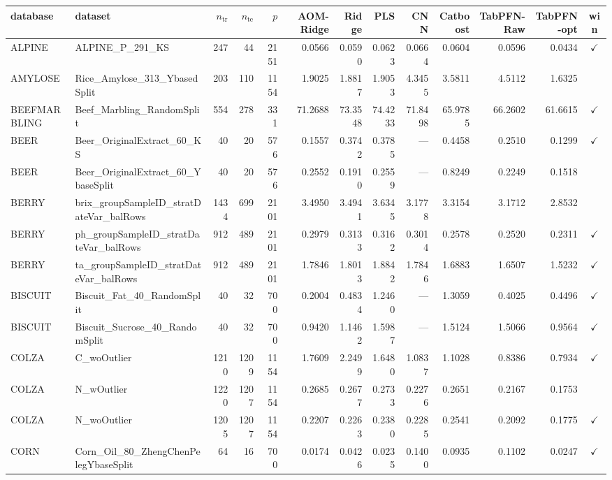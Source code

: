 \begin{tabular}{llrrrrrrrrrrc}
\toprule
database & dataset & $n_\text{tr}$ & $n_\text{te}$ & $p$ & AOM-Ridge & Ridge & PLS & CNN & Catboost & TabPFN-Raw & TabPFN-opt & win \\
\midrule
ALPINE & ALPINE\_P\_291\_KS & 247 & 44 & 2151 & 0.0566 & 0.0590 & 0.0623 & 0.0664 & 0.0604 & 0.0596 & 0.0434 & $\checkmark$ \\
AMYLOSE & Rice\_Amylose\_313\_YbasedSplit & 203 & 110 & 1154 & 1.9025 & 1.8817 & 1.9053 & 4.3455 & 3.5811 & 4.5112 & 1.6325 &  \\
BEEFMARBLING & Beef\_Marbling\_RandomSplit & 554 & 278 & 331 & 71.2688 & 73.3548 & 74.4233 & 71.8498 & 65.9785 & 66.2602 & 61.6615 & $\checkmark$ \\
BEER & Beer\_OriginalExtract\_60\_KS & 40 & 20 & 576 & 0.1557 & 0.3742 & 0.3785 & --- & 0.4458 & 0.2510 & 0.1299 & $\checkmark$ \\
BEER & Beer\_OriginalExtract\_60\_YbaseSplit & 40 & 20 & 576 & 0.2552 & 0.1910 & 0.2559 & --- & 0.8249 & 0.2249 & 0.1518 &  \\
BERRY & brix\_groupSampleID\_stratDateVar\_balRows & 1434 & 699 & 2101 & 3.4950 & 3.4941 & 3.6345 & 3.1778 & 3.3154 & 3.1712 & 2.8532 &  \\
BERRY & ph\_groupSampleID\_stratDateVar\_balRows & 912 & 489 & 2101 & 0.2979 & 0.3133 & 0.3162 & 0.3014 & 0.2578 & 0.2520 & 0.2311 & $\checkmark$ \\
BERRY & ta\_groupSampleID\_stratDateVar\_balRows & 912 & 489 & 2101 & 1.7846 & 1.8013 & 1.8842 & 1.7846 & 1.6883 & 1.6507 & 1.5232 & $\checkmark$ \\
BISCUIT & Biscuit\_Fat\_40\_RandomSplit & 40 & 32 & 700 & 0.2004 & 0.4834 & 1.2460 & --- & 1.3059 & 0.4025 & 0.4496 & $\checkmark$ \\
BISCUIT & Biscuit\_Sucrose\_40\_RandomSplit & 40 & 32 & 700 & 0.9420 & 1.1462 & 1.5987 & --- & 1.5124 & 1.5066 & 0.9564 & $\checkmark$ \\
COLZA & C\_woOutlier & 1210 & 1209 & 1154 & 1.7609 & 2.2499 & 1.6480 & 1.0837 & 1.1028 & 0.8386 & 0.7934 & $\checkmark$ \\
COLZA & N\_wOutlier & 1220 & 1207 & 1154 & 0.2685 & 0.2677 & 0.2733 & 0.2276 & 0.2651 & 0.2167 & 0.1753 &  \\
COLZA & N\_woOutlier & 1205 & 1207 & 1154 & 0.2207 & 0.2263 & 0.2380 & 0.2285 & 0.2541 & 0.2092 & 0.1775 & $\checkmark$ \\
CORN & Corn\_Oil\_80\_ZhengChenPelegYbaseSplit & 64 & 16 & 700 & 0.0174 & 0.0426 & 0.0235 & 0.1400 & 0.0935 & 0.1102 & 0.0247 & $\checkmark$ \\

\end{tabular}
